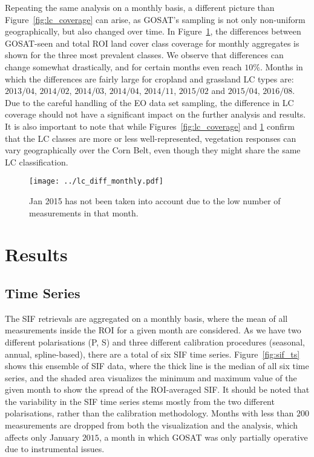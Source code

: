 \documentclass[review, a4paper, 10pt, times]{elsarticle}
\begin{document}
Repeating the same analysis on a monthly basis, a different picture than Figure~\ref{fig:lc_coverage} can arise, as GOSAT's sampling is not only non-uniform geographically, but also changed over time. In Figure~\ref{fig:lc_diff_monthly}, the differences between GOSAT-seen and total ROI land cover class coverage for monthly aggregates is shown for the three most prevalent classes. We observe that differences can change somewhat drastically, and for certain months even reach $10\%$. Months in which the differences are fairly large for cropland and grassland LC types are: $2013/04$, $2014/02$, $2014/03$, $2014/04$, $2014/11$, $2015/02$ and $2015/04$, $2016/08$. Due to the careful handling of the EO data set sampling, the difference in LC coverage should not have a significant impact on the further analysis and results. It is also important to note that while Figures~\ref{fig:lc_coverage} and \ref{fig:lc_diff_monthly} confirm that the LC classes are more or less well-represented, vegetation responses can vary geographically over the Corn Belt, even though they might share the same LC classification.

 
\begin{figure}[htbp]
\centering
\texttt{[image: ../lc\_diff\_monthly.pdf]}
\caption{Jan 2015 has not been taken into account due to the low number of measurements in that month.}
\label{fig:lc_diff_monthly}
\end{figure}

 
\section{Results}

\subsection{Time Series}
\label{sec:SIF_TS}

The SIF retrievals are aggregated on a monthly basis, where the mean of all measurements inside the ROI for a given month are considered. As we have two different polarisations (P, S) and three different calibration procedures (seasonal, annual, spline-based), there are a total of six SIF time series. Figure~\ref{fig:sif_ts} shows this ensemble of SIF data, where the thick line is the median of all six time series, and the shaded area visualizes the minimum and maximum value of the given month to show the spread of the ROI-averaged SIF. It should be noted that the variability in the SIF time series stems mostly from the two different polarisations, rather than the calibration methodology. Months with less than $200$ measurements are dropped from both the visualization and the analysis, which affects only January $2015$, a month in which GOSAT was only partially operative due to instrumental issues.
\end{document}

